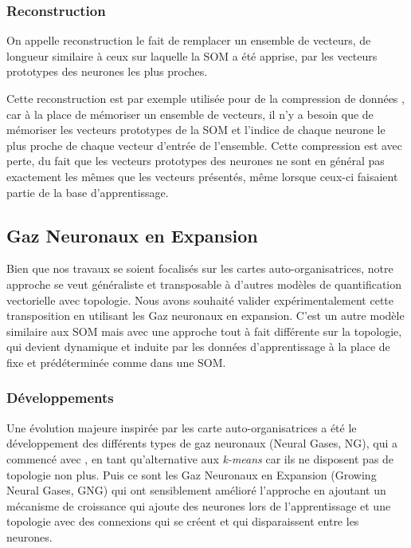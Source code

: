 \subsubsection{Reconstruction}
	
	On appelle reconstruction le fait de remplacer un ensemble de vecteurs, de longueur similaire à ceux sur laquelle la SOM a été apprise, par les vecteurs prototypes des neurones les plus proches.

	Cette reconstruction est par exemple utilisée pour de la compression de données \cite{ettaouil2012improved}, car à la place de mémoriser un ensemble de vecteurs, il n'y a besoin que de mémoriser les vecteurs prototypes de la SOM et l'indice de chaque neurone le plus proche de chaque vecteur d'entrée de l'ensemble. Cette compression est avec perte, du fait que les vecteurs prototypes des neurones ne sont en général pas exactement les mêmes que les vecteurs présentés, même lorsque ceux-ci faisaient partie de la base d'apprentissage.

	\subsection{Gaz Neuronaux en Expansion}

	Bien que nos travaux se soient focalisés sur les cartes auto-organisatrices, notre approche se veut généraliste et transposable à d'autres modèles de quantification vectorielle avec topologie. Nous avons souhaité valider expérimentalement cette transposition en utilisant les Gaz neuronaux en expansion. C'est un autre modèle similaire aux SOM mais avec une approche tout à fait différente sur la topologie, qui devient dynamique et induite par les données d'apprentissage à la place de fixe et prédéterminée comme dans une SOM. 

	\subsubsection{Développements}

	Une évolution majeure inspirée par les carte auto-organisatrices a été le développement des différents types de gaz neuronaux (Neural Gases, NG), qui a commencé avec \cite{martinetz1991neural}, en tant qu'alternative aux \textit{k-means} car ils ne disposent pas de topologie non plus. Puis ce sont les Gaz Neuronaux en Expansion (Growing Neural Gases, GNG) \cite{fritzke1995growing} qui ont sensiblement amélioré l'approche en ajoutant un mécanisme de croissance qui ajoute des neurones lors de l'apprentissage et une topologie avec des connexions qui se créent et qui disparaissent entre les neurones.

